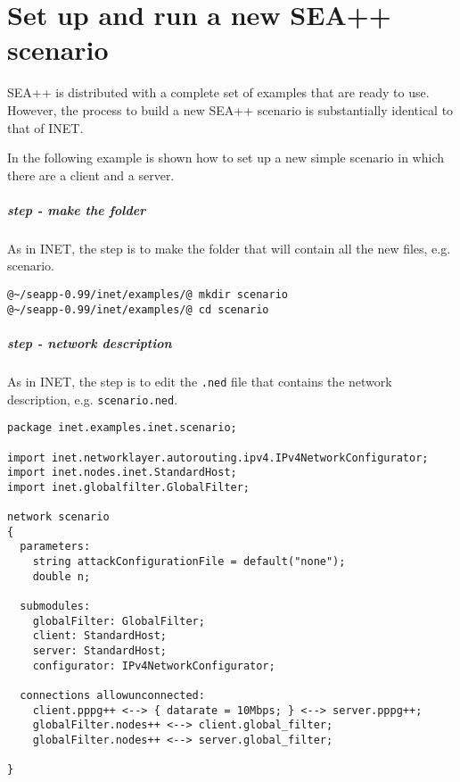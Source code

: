 

\chapter{Set up and run a new SEA++ scenario}
\label{ch:run-scenario}

SEA++ is distributed with a complete set of examples that are ready to use. However, the process to build a new SEA++ scenario is substantially identical to that of INET.

In the following example is shown how to set up a new simple scenario in which there are a client and a server.

\paragraph{ step - make the folder}
As in INET, the  step is to make the folder that will contain all the new files, e.g. scenario.
%
\begin{lstlisting}[language={terminal}]
@~/seapp-0.99/inet/examples/@ mkdir scenario
@~/seapp-0.99/inet/examples/@ cd scenario
\end{lstlisting}


\paragraph{ step - network description}
As in INET, the  step is to edit the \texttt{.ned} file that contains the network description, e.g. \texttt{scenario.ned}.
%
\begin{lstlisting}[language={ned}, caption={scenario.ned}, label={lst:build-scenario-ned}]
package inet.examples.inet.scenario;

import inet.networklayer.autorouting.ipv4.IPv4NetworkConfigurator;
import inet.nodes.inet.StandardHost;
import inet.globalfilter.GlobalFilter;

network scenario
{
  parameters:
    string attackConfigurationFile = default("none");
    double n;

  submodules:
    globalFilter: GlobalFilter;
    client: StandardHost;
    server: StandardHost;
    configurator: IPv4NetworkConfigurator;
        
  connections allowunconnected:
    client.pppg++ <--> { datarate = 10Mbps; } <--> server.pppg++;
    globalFilter.nodes++ <--> client.global_filter;
    globalFilter.nodes++ <--> server.global_filter;
    
}
\end{lstlisting}


